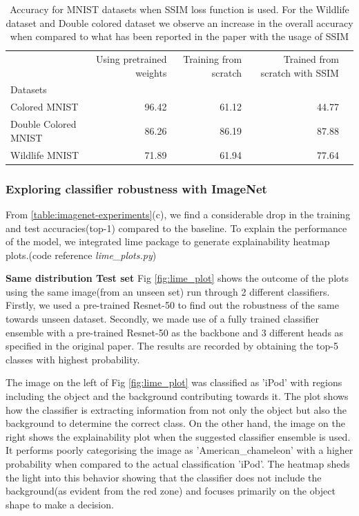 \begin{table}[h]
\centering
\tiny
\begin{tabular}{lrrrr}
\toprule
{} & Using pretrained weights &  Training from scratch & Trained from scratch with SSIM \citep{wang2004image}\\
Datasets  &              &              &                            \\
\midrule
Colored MNIST              &        96.42 &        61.12 &         44.77  \\
Double Colored MNIST              &        86.26  &        86.19 &         87.88  \\
Wildlife MNIST              &        71.89 &        61.94 &         77.64  \\
\bottomrule
\end{tabular}
\caption{Accuracy for MNIST datasets when SSIM  \citep{wang2004image} loss function is used. For the Wildlife dataset  and Double colored dataset we observe an increase in the overall accuracy when compared to what has been reported in the paper with the usage of SSIM \citep{wang2004image} }
\label{table:ssim-table}

\end{table}

\subsubsection{Exploring classifier robustness with ImageNet}

From \ref{table:imagenet-experiments}(c), we find a considerable drop in the training and test accuracies(top-1) compared to the baseline. To explain the performance of the model, we integrated lime\cite{lime} package to generate explainability heatmap plots.(code reference \textit{lime\_plots.py})

\textbf{Same distribution Test set}
Fig \ref{fig:lime_plot} shows the outcome of the plots using the same image(from an unseen set) run through 2 different classifiers. Firstly, we used a pre-trained Resnet-50 to find out the robustness of the same towards unseen dataset. Secondly, we made use of a fully trained classifier ensemble with a pre-trained Resnet-50 as the backbone and 3 different heads as specified in the original paper\cite{sauer2021counterfactual}. The results are recorded by obtaining the top-5 classes with highest probability. 

The image on the left of Fig \ref{fig:lime_plot} was classified as 'iPod' with regions including the object and the background contributing towards it. The plot shows how the classifier is extracting information from not only the object but also the background to determine the correct class. On the other hand, the image on the right shows the explainability plot when the suggested classifier ensemble is used. It performs poorly categorising the image as 'American\_chameleon' with a higher probability when compared to the actual classification 'iPod'. The heatmap sheds the light into this behavior showing that the classifier does not include the background(as evident from the red zone) and focuses primarily on the object shape to make a decision.

